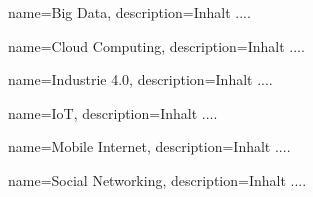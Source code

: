 \makeglossaries




{
	name=Big Data,
	description={Inhalt ....}
}


{
	name=Cloud Computing,
	description={Inhalt ....}
}


{
	name=Industrie 4.0,
	description={Inhalt ....}
}


{
	name=IoT,
	description={Inhalt ....}
}


{
	name=Mobile Internet,
	description={Inhalt ....}
}


{
	name=Social Networking,
	description={Inhalt ....}
}


